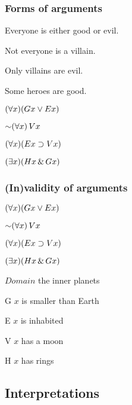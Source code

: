 \begin{frame}
\frametitle{Forms of arguments}

\begin{earg}
  \item[] Everyone is either good or evil.
  \item[] Not everyone is a villain.
  \item[] Only villains are evil.
  \item[\therefore] Some heroes are good.
\end{earg}

\begin{earg}
\item[] $(\forall x)( Gx \vee  Ex)$
\item[] $\enot \qt{\forall}{x}\, V\qv{x}$
\item[] $(\forall x) (Ex \supset Vx)$
\item[\therefore] $(\exists x) (Hx \,\&\, Gx)$
\end{earg}

\end{frame}


\begin{frame}
\frametitle{(In)validity of arguments}

\begin{earg}
\item[] $(\forall x)( Gx \vee  Ex)$
\item[] $\enot \qt{\forall}{x}\, V\qv{x}$
\item[] $(\forall x) (Ex \supset Vx)$
\item[\therefore] $(\exists x) (Hx \,\&\, Gx)$
\end{earg}

\begin{ekey}
\item[$Domain$] the inner planets
\item[G\qv{x}] $x$ is smaller than Earth
\item[E\qv{x}] $x$ is inhabited
\item[V\qv{x}] $x$ has a moon
\item[H\qv{x}] $x$ has rings
\end{ekey}
\end{frame}

\subsection{Interpretations}

